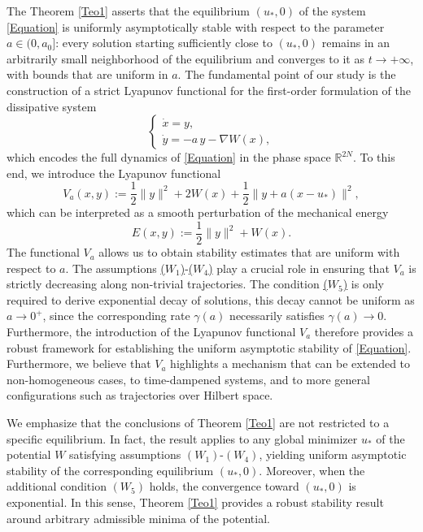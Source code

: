 \documentclass[12pt]{amsart}
\numberwithin{equation}{section}
\begin{document}
The Theorem \ref{Teo1} asserts that the equilibrium $(u_*,0)$ of the system \eqref{Equation} is uniformly asymptotically stable with respect to the parameter $a\in(0,a_0]$: every solution starting sufficiently close to $(u_*,0)$ remains in an arbitrarily small neighborhood of the equilibrium and converges to it as $t\to +\infty$, with bounds that are uniform in $a$. The fundamental point of our study is the construction of a strict Lyapunov functional for the first-order formulation of the dissipative system
\begin{equation}\label{S-intro}
	\begin{cases}
		\dot{x}=y,\\[1mm]
		\dot{y}=-a\,y-\nabla W(x),
	\end{cases}
\end{equation}
which encodes the full dynamics of \eqref{Equation} in the phase space $\mathbb{R}^{2N}$. To this end, we introduce the Lyapunov functional
\begin{equation}
	V_a(x,y):=\frac{1}{2}\|y\|^2+2W(x)+\frac{1}{2}\|y+a(x-u_*)\|^2,
\end{equation}
which can be interpreted as a smooth perturbation of the mechanical energy
$$
E(x,y):=\frac12\|y\|^2+W(x).
$$
The functional $V_a$ allows us to obtain stability estimates that are uniform with respect to $a$. The assumptions \hyperlink{W1}{($W_1$)}-\hyperlink{W4}{($W_4$)} play a crucial role in ensuring that $V_a$ is strictly decreasing along non-trivial trajectories. The condition \hyperlink{W5}{($W_5$)} is only required to derive exponential decay of solutions, this decay cannot be uniform as $a\to 0^{+}$, since the corresponding rate $\gamma(a)$ necessarily satisfies $\gamma(a)\to 0$. Furthermore, the introduction of the Lyapunov functional $V_a$ therefore provides a robust framework for establishing the uniform asymptotic stability of \eqref{Equation}. Furthermore, we believe that $V_a$ highlights a mechanism that can be extended to non-homogeneous cases, to time-dampened systems, and to more general configurations such as trajectories over Hilbert space.

We emphasize that the conclusions of Theorem \ref{Teo1} are not restricted to a specific equilibrium. In fact, the result applies to any global minimizer $u_*$ of the potential $W$ satisfying assumptions \hyperlink{W1}{$(W_1)$}-\hyperlink{W4}{$(W_4)$}, yielding uniform asymptotic stability of the corresponding equilibrium $(u_*,0)$. Moreover, when the additional condition \hyperlink{W5}{$(W_5)$} holds, the convergence toward $(u_*,0)$ is exponential. In this sense, Theorem \ref{Teo1} provides a robust stability result around arbitrary admissible minima of the potential.
\end{document}
